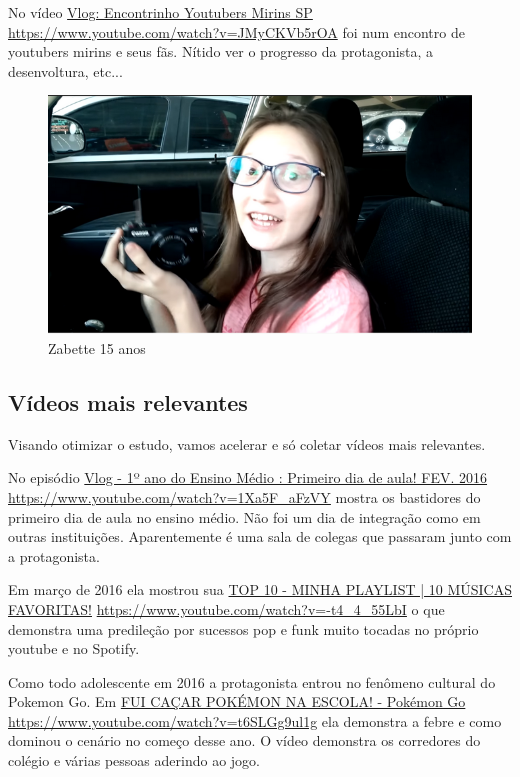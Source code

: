 No vídeo \href{https://www.youtube.com/watch?v=JMyCKVb5rOA}{Vlog: Encontrinho Youtubers Mirins SP} \url{https://www.youtube.com/watch?v=JMyCKVb5rOA} foi num encontro de youtubers mirins e seus fãs. Nítido ver o progresso da protagonista, a desenvoltura, etc...

\begin{figure}[h!]
    \centering
    \includegraphics[width=0.7\linewidth]{fig/Zabetta-15-anos}
    \caption{Zabette 15 anos}
    \label{fig:zabetta-15-anos}
\end{figure}


\subsection{Vídeos mais relevantes}

Visando otimizar o estudo, vamos acelerar e só coletar vídeos mais relevantes.

No episódio \href{https://www.youtube.com/watch?v=1Xa5F_aFzVY}{Vlog - 1º ano do Ensino Médio : Primeiro dia de aula! FEV. 2016} \url{https://www.youtube.com/watch?v=1Xa5F_aFzVY} mostra os bastidores do primeiro dia de aula no ensino médio. Não foi um dia de integração como em outras instituições. Aparentemente é uma sala de colegas que passaram junto com a protagonista.

Em março de 2016 ela mostrou sua \href{https://www.youtube.com/watch?v=-t4_4_55LbI}{TOP 10 - MINHA PLAYLIST | 10 MÚSICAS FAVORITAS!} \url{https://www.youtube.com/watch?v=-t4_4_55LbI} o que demonstra uma predileção por sucessos pop e funk muito tocadas no próprio youtube e no Spotify.

Como todo adolescente em 2016 a protagonista entrou no fenômeno cultural do Pokemon Go. Em \href{https://www.youtube.com/watch?v=t6SLGg9ul1g}{FUI CAÇAR POKÉMON NA ESCOLA! - Pokémon Go} \url{https://www.youtube.com/watch?v=t6SLGg9ul1g} ela demonstra a febre e como dominou o cenário no começo desse ano. O vídeo demonstra os corredores do colégio e várias pessoas aderindo ao jogo.

